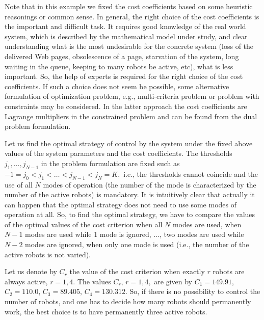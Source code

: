 \documentclass[11pt]{article}
\begin{document}
Note that in this example we fixed the cost coefficients based on
some heuristic reasonings or common sense. In general, the right
choice of the cost coefficients is the important and difficult task.
It requires good knowledge of the real world system, which is
described by the mathematical model under study, and clear
understanding what is the most undesirable for the concrete system
(loss of the delivered Web pages, obsolescence of a page, starvation
of the system, long waiting in the queue, keeping to many robots be
active, etc), what is less important. So, the help of experts is
required for the right choice of the cost coefficients. If such a
choice does not seem be possible, some alternative formulation of
optimization problem, e.g., multi-criteria problem or problem with
constraints may be considered. In the latter approach the cost
coefficients are Lagrange multipliers in the constrained problem
and can be found from the dual problem formulation. 

Let us find the optimal strategy of control by the system under the
fixed above values of the system parameters and the cost
coefficients. The thresholds $j_1,\dots,j_{N-1}$ in the problem
formulation are fixed such as $-1=j_0<j_1<\dots< j_{N-1}<j_N=K,$
i.e., the thresholds cannot coincide and the use of  all $N$ modes
of operation (the number of the mode is characterized by the number
of the active robots) is mandatory. It is intuitively clear that
actually it can happen that the optimal strategy does not need to
use some modes of operation at all. So, to find the optimal
strategy, we have to compare the values of the optimal values of the
cost criterion when all $N$ modes are used, when $N-1$ modes are
used while 1 mode is ignored, $\dots$, two modes are used while
$N-2$ modes are ignored, when only one mode is used (i.e., the
number of the active robots is not varied).

Let us denote by $C_r$ the value of the cost criterion when exactly
$r$ robots are always active, $r=\overline{1,4}.$ The values $C_r$,
$r=\overline{1,4},$ are given by $C_1=149.91$, $C_2=110.0$,
$C_3=89.405$, $C_4=130.312$. So, if there is no possibility to
control the number of robots, and one has to decide how many robots
should permanently work, the best choice is  to have permanently
three active robots.
\end{document}
